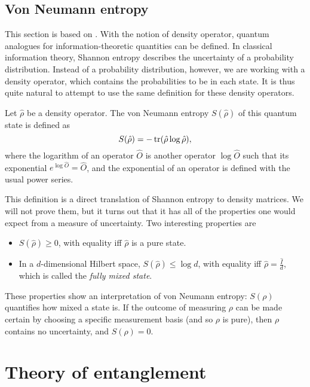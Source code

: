 \subsection{Von Neumann entropy}

This section is based on \cite[pp. 510-527]{nielsen_quantum_2010}. With the notion of density operator, quantum analogues for information-theoretic quantities can be defined. In classical information theory, Shannon entropy describes the uncertainty of a probability distribution. Instead of a probability distribution, however, we are working with a density operator, which contains the probabilities to be in each state. It is thus quite natural to attempt to use the same definition for these density operators.

\begin{definition}
    Let $\hat{\rho}$ be a density operator. The von Neumann entropy $S(\hat{\rho})$ of this quantum state is defined as
    \begin{equation}
        S(\hat{\rho}) = - \operatorname{tr}(\hat{\rho} \log \hat{\rho}),
    \end{equation}
    where the logarithm of an operator $\hat{O}$ is another operator $\log \hat{O}$ such that its exponential $e^{\log \hat{O}} = \hat{O}$, and the exponential of an operator is defined with the usual power series.
\end{definition}

This definition is a direct translation of Shannon entropy to density matrices. We will not prove them, but it turns out that it has all of the properties one would expect from a measure of uncertainty. Two interesting properties are

\begin{itemize}
    \item $S(\hat{\rho}) \geq 0$, with equality iff $\hat{\rho}$ is a pure state.
    \item In a $d$-dimensional Hilbert space, $S(\hat{\rho}) \leq \log d$, with equality iff $\hat{\rho} = \frac{\hat{I}}{d}$, which is called the \textit{fully mixed state}.
\end{itemize}

These properties show an interpretation of von Neumann entropy: $S(\rho)$ quantifies how mixed a state is. If the outcome of measuring $\rho$ can be made certain by choosing a specific measurement basis (and so $\rho$ is pure), then $\rho$ contains no uncertainty, and $S(\rho) = 0$.

\section{Theory of entanglement} \label{sec:entanglement}

